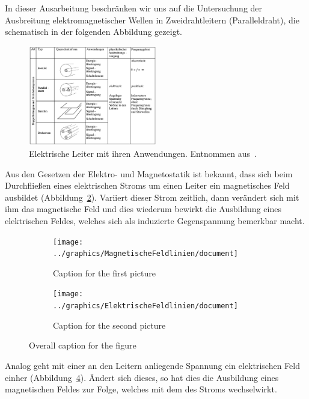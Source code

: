 \documentclass[paper=a4, parskip=half-, ngerman, fontsize=11pt]{scrreprt}
\begin{document}
In dieser Ausarbeitung beschränken wir uns auf die Untersuchung der Ausbreitung elektromagnetischer Wellen in
Zweidrahtleitern (Paralleldraht), die schematisch in der folgenden Abbildung gezeigt.
\begin{figure}[!h]
    \begin{center}
        \includegraphics[width=0.5\textwidth]{images/Leiter.png}
        \caption{Elektrische Leiter mit ihren Anwendungen. Entnommen aus~\cite{FernuniSkript}.}
        \label{Leiter}
    \end{center}
\end{figure}

Aus den Gesetzen der Elektro- und Magnetostatik ist bekannt, dass sich beim Durchfließen eines elektrischen Stroms um
einen Leiter ein magnetisches Feld ausbildet (Abbildung~\ref{Felder1}). Variiert dieser Strom zeitlich, dann
verändert sich mit ihm das magnetische Feld und dies wiederum bewirkt die Ausbildung eines elektrischen Feldes, welches
sich als induzierte Gegenspannung bemerkbar macht.
\begin{figure}[!ht]
    \begin{subfigure}[b]{0.5\textwidth}
        \centering
%        
        \texttt{[image: ../graphics/MagnetischeFeldlinien/document]}
        \caption{\color{red}Caption for the first picture}
        \label{Felder1}
    \end{subfigure}%
    \hfill
    \begin{subfigure}[b]{0.45\textwidth}
        \centering
%        
        \texttt{[image: ../graphics/ElektrischeFeldlinien/document]}
        \caption{\color{red}Caption for the second picture}
        \label{Felder2}
    \end{subfigure}
    \caption{\color{red}Overall caption for the figure}
\end{figure}
Analog geht mit einer an den Leitern anliegende Spannung ein elektrischen Feld einher (Abbildung~\ref{Felder2}).
Ändert sich dieses, so hat dies die Ausbildung eines magnetischen Feldes zur Folge, welches mit dem des Stroms
wechselwirkt.
\end{document}
